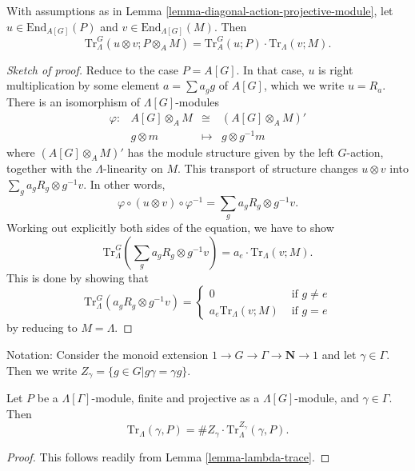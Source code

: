 \begin{lemma}
\label{lemma-multiplicative-trace}
With assumptions as in
Lemma \ref{lemma-diagonal-action-projective-module},
let
$u\in \text{End}_{A[G]}(P)$ and $v\in \text{End}_{\Lambda[G]}(M)$. Then
$$
\text{Tr}_\Lambda^G \left(u \otimes v; P \otimes_A M\right) = \text{Tr}_A^G(u;
P)\cdot \text{Tr}_\Lambda(v;M).
$$
\end{lemma}

\begin{proof}[Sketch of proof]
Reduce to the case $P=A[G]$. In that case, $u$ is right multiplication by some
element $a = \sum a_gg$ of $A[G]$, which we write $u = R_a$. There is an
isomorphism of $\Lambda[G]$-modules
$$
\begin{matrix}
\varphi : & A[G]\otimes_A M & \cong & \left(A[G]\otimes_A M\right)'\\
& g \otimes m & \longmapsto & g \otimes g^{-1}m
\end{matrix}
$$
where $\left(A[G]\otimes_A M\right)'$ has the module structure given by the
left $G$-action, together with the $\Lambda$-linearity on $M$. This transport
of structure changes $u \otimes v$ into $\sum_ga_gR_g \otimes g^{-1}v$. In other
words,
$$
\varphi \circ (u \otimes v) \circ \varphi^{-1}
=
\sum_ga_gR_g \otimes g^{-1}v.
$$
Working out explicitly both sides of the equation, we have to show
$$
\text{Tr}_\Lambda^G\left(\sum_g a_gR_g \otimes g^{-1}v\right) = a_e\cdot
\text{Tr}_\Lambda(v; M).
$$
This is done by showing that
$$
\text{Tr}_\Lambda^G\left(a_gR_g \otimes g^{-1}v\right) =
\left\{
\begin{matrix}
0 & \text{ if } g\neq e\\
a_e\text{Tr}_\Lambda\left(v; M\right) & \text{ if }g = e
\end{matrix}
\right.
$$
by reducing to $M=\Lambda$.
\end{proof}

\noindent
Notation:
Consider the monoid extension $1 \to G\to \Gamma\to \mathbf{N} \to 1$ and let
$\gamma\in \Gamma$.
Then we write $Z_\gamma = \{g\in G | g\gamma = \gamma g\}$.

\begin{lemma}
\label{lemma-gamma-z-gamma-trace}
Let $P$ be a $\Lambda[\Gamma]$-module, finite and projective as a
$\Lambda[G]$-module, and $\gamma \in \Gamma$. Then
$$
\text{Tr}_{\Lambda}(\gamma, P) =
\# Z_\gamma \cdot \text{Tr}_\Lambda^{Z_\gamma}\left(\gamma, P\right).
$$
\end{lemma}

\begin{proof}
This follows readily from Lemma \ref{lemma-lambda-trace}.
\end{proof}

